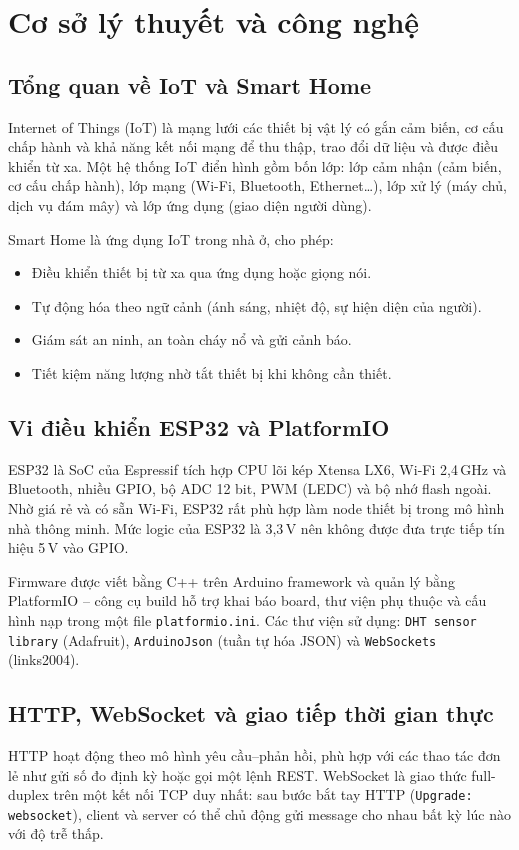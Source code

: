 \documentclass[12pt,a4paper]{extarticle}
\begin{document}
\section{Cơ sở lý thuyết và công nghệ}
\subsection{Tổng quan về IoT và Smart Home}
Internet of Things (IoT) là mạng lưới các thiết bị vật lý có gắn cảm biến, cơ cấu chấp hành và khả năng kết nối mạng để thu thập, trao đổi dữ liệu và được điều khiển từ xa. Một hệ thống IoT điển hình gồm bốn lớp: lớp cảm nhận (cảm biến, cơ cấu chấp hành), lớp mạng (Wi-Fi, Bluetooth, Ethernet\ldots), lớp xử lý (máy chủ, dịch vụ đám mây) và lớp ứng dụng (giao diện người dùng).

Smart Home là ứng dụng IoT trong nhà ở, cho phép:
\begin{itemize}
  \item Điều khiển thiết bị từ xa qua ứng dụng hoặc giọng nói.
  \item Tự động hóa theo ngữ cảnh (ánh sáng, nhiệt độ, sự hiện diện của người).
  \item Giám sát an ninh, an toàn cháy nổ và gửi cảnh báo.
  \item Tiết kiệm năng lượng nhờ tắt thiết bị khi không cần thiết.
\end{itemize}

\subsection{Vi điều khiển ESP32 và PlatformIO}
ESP32 là SoC của Espressif tích hợp CPU lõi kép Xtensa LX6, Wi-Fi 2,4\,GHz và Bluetooth, nhiều GPIO, bộ ADC 12 bit, PWM (LEDC) và bộ nhớ flash ngoài. Nhờ giá rẻ và có sẵn Wi-Fi, ESP32 rất phù hợp làm node thiết bị trong mô hình nhà thông minh. Mức logic của ESP32 là 3,3\,V nên không được đưa trực tiếp tín hiệu 5\,V vào GPIO.

Firmware được viết bằng C++ trên Arduino framework và quản lý bằng PlatformIO -- công cụ build hỗ trợ khai báo board, thư viện phụ thuộc và cấu hình nạp trong một file \texttt{platformio.ini}. Các thư viện sử dụng: \texttt{DHT sensor library} (Adafruit), \texttt{ArduinoJson} (tuần tự hóa JSON) và \texttt{WebSockets} (links2004).

\subsection{HTTP, WebSocket và giao tiếp thời gian thực}
HTTP hoạt động theo mô hình yêu cầu--phản hồi, phù hợp với các thao tác đơn lẻ như gửi số đo định kỳ hoặc gọi một lệnh REST. WebSocket là giao thức full-duplex trên một kết nối TCP duy nhất: sau bước bắt tay HTTP (\texttt{Upgrade: websocket}), client và server có thể chủ động gửi message cho nhau bất kỳ lúc nào với độ trễ thấp.
\end{document}
